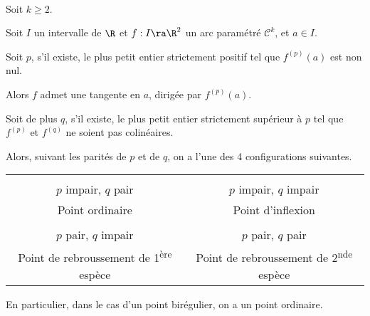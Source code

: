 \documentclass[12pt]{article}
\begin{document}
\begin{Prop}~

Soit $k\geq 2$.

Soit $I$ un intervalle de $\R$ et $f:I\ra \R^2$ un arc paramétré
$\mathcal{C}^k$, et $a\in I$.

Soit $p$, s'il existe, le plus petit entier strictement positif tel que $f^{(p)}(a)$ est
non nul. 

Alors $f$ admet une tangente en $a$, dirigée par $f^{(p)}(a)$.

Soit de plus $q$, s'il existe, le plus petit entier strictement supérieur à
$p$ tel que $f^{(p)}$ et $f^{(q)}$ ne soient pas colinéaires.

Alors, suivant les parités de $p$ et de $q$, on a l'une des 4 configurations
suivantes. 
\begin{tabular}{cc}
&\\
$p$ impair, $q$ pair & $p$ impair, $q$ impair \\
Point ordinaire & Point d'inflexion\\
&\\
$p$ pair, $q$ impair & $p$ pair, $q$ pair \\
Point de rebroussement de 1\textsuperscript{ère} espèce &
Point de rebroussement de 2\textsuperscript{nde} espèce \\
\end{tabular}

\end{Prop}

En particulier, dans le cas d'un point birégulier, on a un point ordinaire.
\end{document}
